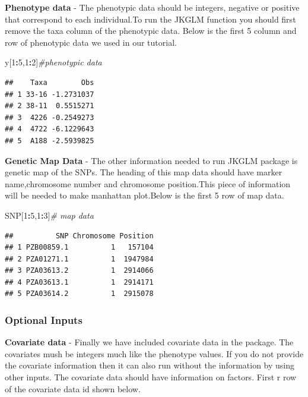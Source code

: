 \documentclass[
]{article}
\newenvironment{Shaded}{\begin{snugshade}}{\end{snugshade}}
\newcommand{\CommentTok}[1]{\textcolor[rgb]{0.56,0.35,0.01}{\textit{#1}}}
\newcommand{\DecValTok}[1]{\textcolor[rgb]{0.00,0.00,0.81}{#1}}
\newcommand{\NormalTok}[1]{#1}
\newcommand{\OperatorTok}[1]{\textcolor[rgb]{0.81,0.36,0.00}{\textbf{#1}}}
\begin{document}
\textbullet \textbf{Phenotype data} - The phenotypic data should be
integers, negative or positive that correspond to each individual.To run
the JKGLM function you should first remove the taxa column of the
phenotypic data. Below is the first 5 column and row of phenotypic data
we used in our tutorial.

\begin{Shaded}
\begin{Highlighting}[]
\NormalTok{y[}\DecValTok{1}\OperatorTok{:}\DecValTok{5}\NormalTok{,}\DecValTok{1}\OperatorTok{:}\DecValTok{2}\NormalTok{]}\CommentTok{\#phenotypic data}
\end{Highlighting}
\end{Shaded}

\begin{verbatim}
##    Taxa        Obs
## 1 33-16 -1.2731037
## 2 38-11  0.5515271
## 3  4226 -0.2549273
## 4  4722 -6.1229643
## 5  A188 -2.5939825
\end{verbatim}

\textbullet \textbf{Genetic Map Data} - The other information needed to
run JKGLM package is genetic map of the SNPs. The heading of this map
data should have marker name,chromosome number and chromosome
position.This piece of information will be needed to make manhattan
plot.Below is the first 5 row of map data.

\begin{Shaded}
\begin{Highlighting}[]
\NormalTok{SNP[}\DecValTok{1}\OperatorTok{:}\DecValTok{5}\NormalTok{,}\DecValTok{1}\OperatorTok{:}\DecValTok{3}\NormalTok{]}\CommentTok{\# map data}
\end{Highlighting}
\end{Shaded}

\begin{verbatim}
##          SNP Chromosome Position
## 1 PZB00859.1          1   157104
## 2 PZA01271.1          1  1947984
## 3 PZA03613.2          1  2914066
## 4 PZA03613.1          1  2914171
## 5 PZA03614.2          1  2915078
\end{verbatim}

\hypertarget{optional-inputs}{%
\subsubsection{\texorpdfstring{\textbf{Optional
Inputs}}{Optional Inputs}}\label{optional-inputs}}

\textbullet \textbf{Covariate data} - Finally we have included covariate
data in the package. The covariates mush be integers much like the
phenotype values. If you do not provide the covariate information then
it can also run without the information by using other inputs. The
covariate data should have information on factors. First r row of the
covariate data id shown below.
\end{document}
